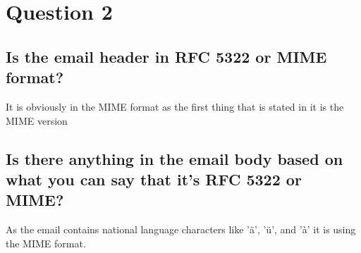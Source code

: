 \documentclass{report}
\begin{document}
	\section{Question 2}
	\startsection
		\renewcommand{\thesubsection}{\thesection.\Alph{subsection}}
		\subsection{Is the email header in RFC 5322 or MIME format?}
		\startsubsection
			It is obviously in the MIME format as the first thing that is stated in it is the MIME version
		\closesection
		\subsection{Is there anything in the email body based on what you can say that it's RFC 5322 or MIME?}
		\startsubsection
			As the email contains national language characters like 'ä', 'ü', and 'à' it is using the MIME format.
		\closesection
	\closesection
\end{document}
